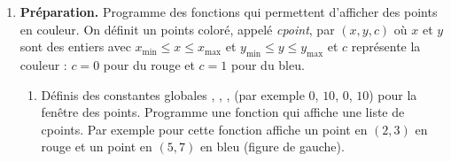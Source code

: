 \documentclass[10pt,class=report,crop=false]{standalone}
\begin{document}

\begin{activite}
	


\begin{enumerate}
	\item \textbf{Préparation.}
	Programme des fonctions qui permettent d'afficher des points en couleur.
	On définit un points coloré, appelé \emph{cpoint}, par $(x,y,c)$
	où $x$ et $y$ sont des entiers avec $x_{\min} \le x \le x_{\max}$ et $y_{\min} \le y \le y_{\max}$
	et $c$ représente la couleur : $c=0$ pour du rouge et $c=1$ pour du bleu.
	
	
	\begin{enumerate}
		\item Définis des constantes globales , , ,  (par exemple $0$, $10$, $0$, $10$) pour la fenêtre des points.
		Programme une fonction  qui affiche une liste de cpoints.
		Par exemple pour  cette fonction affiche un point en $(2,3)$ en rouge et un point en $(5,7)$ en bleu (figure de gauche).
		

\end{enumerate}
\end{enumerate}
\end{activite}
\end{document}
